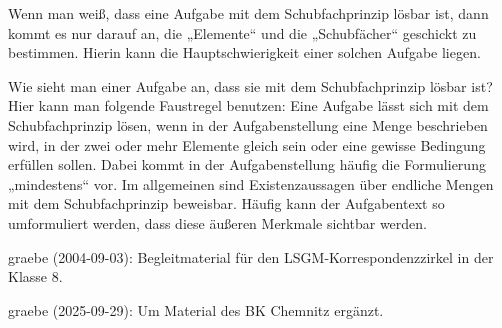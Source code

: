\documentclass[11pt]{article}
\begin{document}
Wenn man weiß, dass eine Aufgabe mit dem Schubfachprinzip lösbar ist, dann
kommt es nur darauf an, die „Elemente“ und die „Schubfächer“ geschickt zu
bestimmen. Hierin kann die Hauptschwierigkeit einer solchen Aufgabe liegen.

Wie sieht man einer Aufgabe an, dass sie mit dem Schubfachprinzip lösbar ist?
Hier kann man folgende Faustregel benutzen: Eine Aufgabe lässt sich mit dem
Schubfachprinzip lösen, wenn in der Aufgabenstellung eine Menge beschrieben
wird, in der zwei oder mehr Elemente gleich sein oder eine gewisse Bedingung
erfüllen sollen. Dabei kommt in der Aufgabenstellung häufig die Formulierung
„mindestens“ vor. Im allgemeinen sind Existenzaussagen über endliche Mengen
mit dem Schubfachprinzip beweisbar.  Häufig kann der Aufgabentext so
umformuliert werden, dass diese äußeren Merkmale sichtbar werden.

\begin{attribution}
graebe (2004-09-03): Begleitmaterial für den LSGM-Korrespondenzzirkel in der
Klasse 8.

graebe (2025-09-29): Um Material des BK Chemnitz ergänzt.
\end{attribution}
\end{document}
